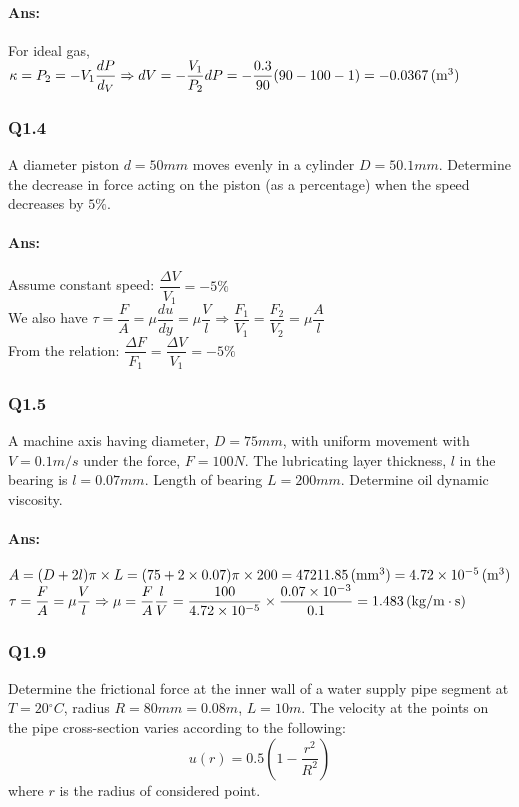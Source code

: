 \paragraph{Ans:}$ $\\
For ideal gas, $ \kappa = P_2 = -V_1\dfrac{dP}{d_V} \\
\Rightarrow dV = -\dfrac{V_1}{P_2}dP=-\dfrac{0.3}{90}(90-100-1)=-0.0367\, (\mathrm{m^3})$
\subsubsection{Q1.4}
A diameter piston $ d=50 \unit{mm} $ moves evenly in a  cylinder $ D=50.1 \unit{mm} $. Determine the decrease in force acting on the piston (as a percentage) when the speed decreases by $ 5\% $.
\paragraph{Ans:}$ $\\
Assume constant speed: $ \dfrac{\Delta V}{V_1} = -5\%$\\
We also have $ \tau = \dfrac{F}{A} = \mu \dfrac{du}{dy} = \mu\dfrac{V}{l}\Rightarrow \dfrac{F_1}{V_1} = \dfrac{F_2}{V_2} = \mu \dfrac{A}{l}$\\
From the relation: $ \dfrac{\Delta F}{F_1} = \dfrac{\Delta V}{V_1}=-5\%$
\subsubsection{Q1.5}
A machine axis having diameter, $ D = 75 \unit{mm} $, with uniform movement with $  V = 0.1 \unit{m/s} $ under the force, $ F = 100\unit{N} $. The lubricating layer thickness, $ l $ in the bearing is $ l=0.07 \unit{mm} $. Length of bearing $ L = 200 \unit{mm} $. Determine oil dynamic viscosity.
\paragraph{Ans:}$ $\\
$ A = (D+2l)\pi\times L = (75+2\times0.07)\pi\times200=47211.85\, (\mathrm{mm^3}) =4.72\times10^{-5}\, (\mathrm{m^3})$\\
$ \tau=\dfrac{F}{A}=\mu\dfrac{V}{l}\Rightarrow\mu=\dfrac{F}{A}\dfrac{l}{V}=\dfrac{100}{4.72\times10^{-5}}\times \dfrac{0.07\times10^{-3}}{0.1}=1.483\, (\mathrm{kg/m\cdot s})$

\subsubsection{Q1.9}
Determine the frictional force at the inner wall of a water supply pipe segment at $T= 20\unit{^\circ C} $, radius $ R = 80\unit{mm} = 0.08\unit{m}$, $L= 10 \unit{m} $. The velocity at the points on the pipe cross-section varies according
to the following:
\[u(r)=0.5\left(1-\dfrac{r^2}{R^2}\right)\]
where $ r $ is the radius of considered point.
